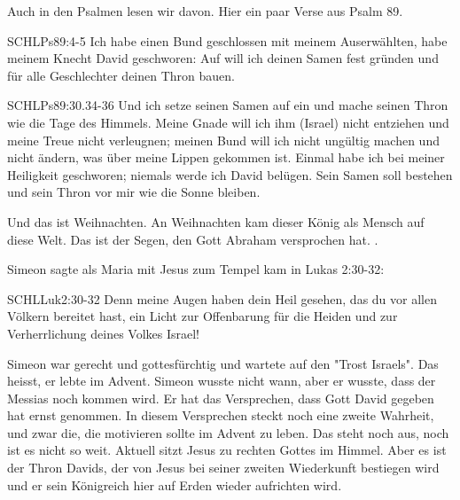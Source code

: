 \begin{otsblock}[Einführung]
    Auch in den Psalmen lesen wir davon. Hier ein paar Verse aus Psalm 89.
     \begin{bibelbox}{SCHL}{Ps}{89:4-5}
        Ich habe einen Bund geschlossen mit meinem Auserwählten, habe meinem Knecht David geschworen: Auf  will ich deinen Samen fest gründen und für alle Geschlechter deinen Thron bauen.
    \end{bibelbox}
     \begin{bibelbox}{SCHL}{Ps}{89:30.34-36}
        Und ich setze seinen Samen auf  ein und mache seinen Thron wie die Tage des Himmels. 
        Meine Gnade will ich ihm (Israel) nicht entziehen und meine Treue nicht verleugnen; meinen Bund will ich nicht ungültig machen und nicht ändern, was über meine Lippen gekommen ist. Einmal habe ich bei meiner Heiligkeit geschworen; niemals werde ich David belügen. Sein Samen soll  bestehen und sein Thron vor mir wie die Sonne bleiben.
    \end{bibelbox}
    Und das ist Weihnachten. An Weihnachten kam dieser  König als Mensch auf diese Welt. Das ist der Segen, den Gott Abraham versprochen hat. . 

    Simeon sagte als Maria mit Jesus zum Tempel kam in Lukas 2:30-32:
    \begin{bibelbox}{SCHL}{Luk}{2:30-32}
        Denn meine Augen haben dein Heil gesehen, das du vor allen Völkern bereitet hast, ein Licht zur Offenbarung für die Heiden und zur Verherrlichung deines Volkes Israel!
    \end{bibelbox}
    Simeon war gerecht und gottesfürchtig und wartete auf den "Trost Israels". Das heisst, er lebte im Advent. Simeon wusste nicht wann, aber er wusste, dass der Messias noch kommen wird. Er hat das Versprechen, dass Gott David gegeben hat ernst genommen. In diesem Versprechen steckt noch eine zweite Wahrheit, und zwar die, die  motivieren sollte im Advent zu leben.  Das steht noch aus, noch ist es nicht so weit. Aktuell sitzt Jesus zu rechten Gottes im Himmel. Aber es ist der Thron Davids, der von Jesus bei seiner zweiten Wiederkunft bestiegen wird und er sein Königreich hier auf Erden wieder aufrichten wird.


\end{otsblock}
